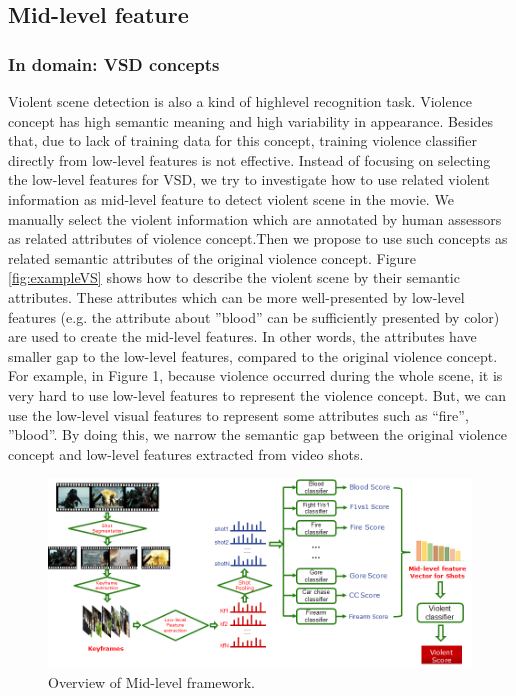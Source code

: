 \documentclass[review]{elsarticle}
\begin{document}
\subsection{Mid-level feature}
\subsubsection{In domain: VSD concepts}

Violent scene detection is also a kind of highlevel recognition task. Violence concept has high semantic meaning and high
variability in appearance. Besides that, due to lack of training data for this concept, training violence classifier directly
from low-level features is not effective. Instead of focusing on selecting the low-level features for VSD, we try to investigate how to use related violent information as mid-level feature to detect violent scene in the movie. We manually select the violent information which are annotated by human assessors as related attributes of violence concept.Then we propose to use such concepts as related semantic attributes of the original violence concept. Figure \ref{fig:exampleVS} shows how to describe the violent scene by their semantic attributes. These attributes which can be more well-presented by low-level features (e.g. the attribute about ”blood” can be sufficiently presented by color) are used to create the mid-level features. In other words, the attributes have smaller gap to the low-level features, compared to the original violence concept. For example, in Figure 1, because violence occurred during the whole scene, it is very hard to use low-level features to represent the violence concept. But, we can use the low-level visual features to represent some attributes such as “fire”, ”blood”. By doing this, we narrow the semantic gap between the original violence concept and low-level features extracted from video shots.
\begin{figure}[!t]
	\centering
	\includegraphics[width=1\linewidth]{Images/Mid-level.png}
	\caption{Overview of Mid-level framework.}
	\label{fig:mid-level}
\end{figure}
\end{document}
